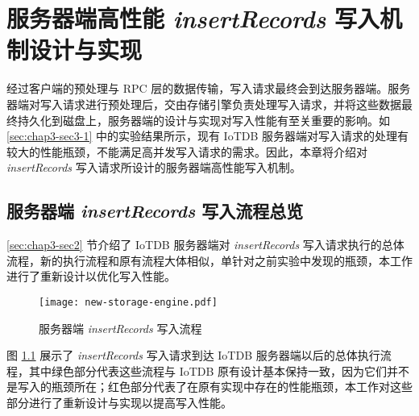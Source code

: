 
\chapter{服务器端高性能 \emph{insertRecords} 写入机制设计与实现}
经过客户端的预处理与 RPC 层的数据传输，写入请求最终会到达服务器端。服务器端对写入请求进行预处理后，交由存储引擎负责处理写入请求，并将这些数据最终持久化到磁盘上，服务器端的设计与实现对写入性能有至关重要的影响。如 \ref{sec:chap3-sec3-1} 中的实验结果所示，现有 IoTDB 服务器端对写入请求的处理有较大的性能瓶颈，不能满足高并发写入请求的需求。因此，本章将介绍对 \emph{insertRecords} 写入请求所设计的服务器端高性能写入机制。


\section{服务器端 \emph{insertRecords} 写入流程总览}
\ref{sec:chap3-sec2} 节介绍了 IoTDB 服务器端对 \emph{insertRecords} 写入请求执行的总体流程，新的执行流程和原有流程大体相似，单针对之前实验中发现的瓶颈，本工作进行了重新设计以优化写入性能。

\begin{figure}
  \centering
  \texttt{[image: new-storage-engine.pdf]}
  \caption{服务器端 \emph{insertRecords} 写入流程}
  \label{fig:iotdb-insertRecords-flow}
\end{figure}

图 \ref{fig:iotdb-insertRecords-flow} 展示了 \emph{insertRecords} 写入请求到达 IoTDB 服务器端以后的总体执行流程，其中绿色部分代表这些流程与 IoTDB 原有设计基本保持一致，因为它们并不是写入的瓶颈所在；红色部分代表了在原有实现中存在的性能瓶颈，本工作对这些部分进行了重新设计与实现以提高写入性能。